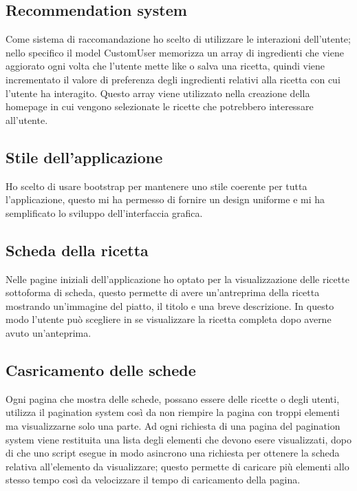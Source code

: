 \documentclass[a4paper]{article}
\begin{document}
        
        \subsection{Recommendation system}
            Come sistema di raccomandazione ho scelto di utilizzare le interazioni dell'utente;
            nello specifico il model CustomUser memorizza un array di ingredienti che viene 
            aggiorato ogni volta che l'utente mette like o salva una ricetta, quindi viene 
            incrementato il valore di preferenza degli ingredienti relativi alla ricetta con cui
            l'utente ha interagito. Questo array viene utilizzato nella creazione della homepage 
            in cui vengono selezionate le ricette che potrebbero interessare all'utente.
        
        
        \subsection{Stile dell'applicazione}
            Ho scelto di usare bootstrap per mantenere uno stile coerente per tutta l'applicazione, 
            questo mi ha permesso di fornire un design uniforme e mi ha semplificato lo sviluppo dell'interfaccia grafica.
        
        
        \subsection{Scheda della ricetta}
            Nelle pagine iniziali dell'applicazione ho optato per la visualizzazione delle ricette 
            sottoforma di scheda, questo permette di avere un'antreprima della ricetta mostrando 
            un'immagine del piatto, il titolo e una breve descrizione.
            In questo modo l'utente può scegliere in se visualizzare la ricetta completa dopo averne avuto 
            un'anteprima.
        
        
        \subsection{Casricamento delle schede}
            Ogni pagina che mostra delle schede, possano essere delle ricette o degli utenti,
            utilizza il pagination system così da non riempire la pagina con troppi elementi ma 
            visualizzarne solo una parte.
            Ad ogni richiesta di una pagina del pagination system viene restituita una lista degli elementi
            che devono esere visualizzati, dopo di che uno script esegue in modo asincrono una richiesta per 
            ottenere la scheda relativa all'elemento da visualizzare; questo permette di caricare più elementi
            allo stesso tempo così da velocizzare il tempo di caricamento della pagina.
        
\end{document}
